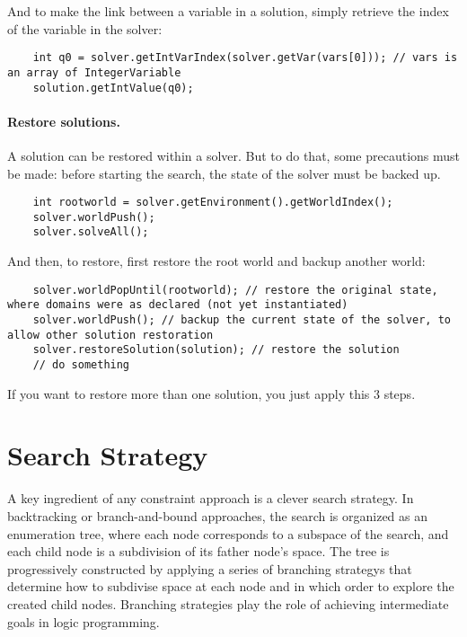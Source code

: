 And to make the link between a variable in a solution, simply retrieve the index of the variable in the solver:
\begin{lstlisting}
	int q0 = solver.getIntVarIndex(solver.getVar(vars[0])); // vars is an array of IntegerVariable
	solution.getIntValue(q0);
\end{lstlisting}

\paragraph{Restore solutions.} A solution can be restored within a solver. But to do that, some precautions must be made: before starting the search, the state of the solver must be backed up.
\begin{lstlisting}
	int rootworld = solver.getEnvironment().getWorldIndex();
	solver.worldPush();
	solver.solveAll();
\end{lstlisting}

And then, to restore, first restore the root world and backup another world:
\begin{lstlisting}
	solver.worldPopUntil(rootworld); // restore the original state, where domains were as declared (not yet instantiated)
	solver.worldPush(); // backup the current state of the solver, to allow other solution restoration
	solver.restoreSolution(solution); // restore the solution
	// do something
\end{lstlisting}
If you want to restore more than one solution, you just apply this 3 steps.

\section{Search Strategy}\label{solver:searchstrategy}\hypertarget{solver:searchstrategy}{}


A key ingredient of any constraint approach is a clever \gls{search strategy}. 
In backtracking or branch-and-bound approaches, the search is organized as an enumeration tree, where each node corresponds to a subspace of the search, and each child node is a subdivision of its father node's space.
The tree is progressively constructed by applying a series of \glspl{branching strategy} that determine how to subdivise space at each node and in which order to explore the created child nodes. Branching strategies play the role of achieving intermediate goals in logic programming. 

